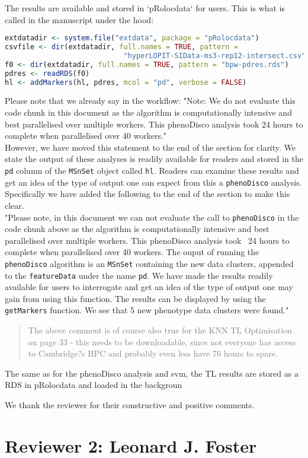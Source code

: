 \documentclass[11pt]{article}
\begin{document}
The results are available and stored in `pRolocdata` for users. This
is what is called in the manuscript under the hood:

\begin{lstlisting}[language=R] 
extdatadir <- system.file("extdata", package = "pRolocdata") 
csvfile <- dir(extdatadir, full.names = TRUE, pattern = 
                            "hyperLOPIT-SIData-ms3-rep12-intersect.csv") 
f0 <- dir(extdatadir, full.names = TRUE, pattern = "bpw-pdres.rds") 
pdres <- readRDS(f0) 
hl <- addMarkers(hl, pdres, mcol = "pd", verbose = FALSE) 
\end{lstlisting}

Please note that we already say in the workflow: "Note: We do not
evaluate this code chunk in this document as the algorithm is
computationally intensive and best parallelised over multiple
workers. This phenoDisco analysis took 24 hours to complete when
parallelised over 40 workers." \newline \\ However, we have moved
this statement to the end of the section for clarity. We state the
output of these analyses is readily available for readers and stored
in the \texttt{pd} column of the \texttt{MSnSet} object called
\texttt{hl}. Readers can examine these results and get an idea of
the type of output one can expect from this a \texttt{phenoDisco}
analysis.  \newline \\ Specifically we have added the following to
the end of the section to make this clear.  \newline \\ "Please
note, in this document we can not evaluate the call to
\texttt{phenoDisco} in the code chunk above as the algorithm is
computationally intensive and best parallelised over multiple
workers. This phenoDisco analysis took ~24 hours to complete when
parallelised over 40 workers.  The ouput of running the
\texttt{phenoDisco} algorithm is an \texttt{MSnSet} containing the
new data clusters, appended to the \texttt{featureData} under the
name \texttt{pd}. We have made the results readily available for
users to interrogate and get an idea of the type of output one may
gain from using this function. The results can be displayed by using
the \texttt{getMarkers} function. We see that 5 new phenotype data
clusters were found."


\begin{quote}  \textcolor{gray}{ The above comment is of course also
true for the KNN TL Optimisation on page 33 - this needs to be
downloadable, since not everyone has access to Cambridge?s HPC and
probably even less have 76 hours to spare.} \end{quote}

The same as for the phenoDisco analysis and svm, the TL results are
stored as a RDS in pRolocdata and loaded in the backgroun


We thank the reviewer for their constructive and positive comments.

\section*{Reviewer 2: Leonard J. Foster}

\begin{quote}\textcolor{gray}{ } \end{quote}
\end{document}
